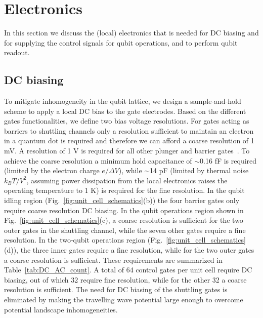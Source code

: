 \documentclass[aps,prl,reprint,superscriptaddress,floatfix]{revtex4-1}
\begin{document}
\section{Electronics}\label{sec:electronics}
In this section we discuss the (local) electronics that is needed for DC biasing and for supplying the control signals for qubit operations, and to perform qubit readout.

\subsection{DC biasing}
To mitigate inhomogeneity in the qubit lattice, we design a sample-and-hold scheme to apply a local DC bias to the gate electrodes.
Based on the different gates functionalities, we define two bias voltage resolutions.
For gates acting as barriers to shuttling channels only a resolution sufficient to maintain an electron in a quantum dot is required and therefore we can afford a coarse resolution of 1 mV.
A resolution of 1 \textmu V is required for all other plunger and barrier gates~\cite{Vandersypen2017}.
To achieve the coarse resolution a minimum hold capacitance of $\sim$0.16 fF is required (limited by the electron charge $e/\Delta V$), while $\sim$14 pF (limited by thermal noise $k_B T/V^2$, assuming power dissipation from the local electronics raises the operating temperature to 1 K) is required for the fine resolution.
In the qubit idling region (Fig.~\ref{fig:unit_cell_schematics}(b)) the four barrier gates only require coarse resolution DC biasing.
In the qubit operations region shown in Fig.~\ref{fig:unit_cell_schematics}(c), a coarse resolution is sufficient for the two outer gates in the shuttling channel, while the seven other gates require a fine resolution.
In the two-qubit operations region (Fig.~\ref{fig:unit_cell_schematics}(d)), the three inner gates require a fine resolution, while for the two outer gates a coarse resolution is sufficient.
These requirements are summarized in Table~\ref{tab:DC_AC_count}.
A total of 64 control gates per unit cell require DC biasing, out of which 32 require fine resolution, while for the other 32 a coarse resolution is sufficient.
The need for DC biasing of the shuttling gates is eliminated by making the travelling wave potential large enough to overcome potential landscape inhomogeneities.
\end{document}
